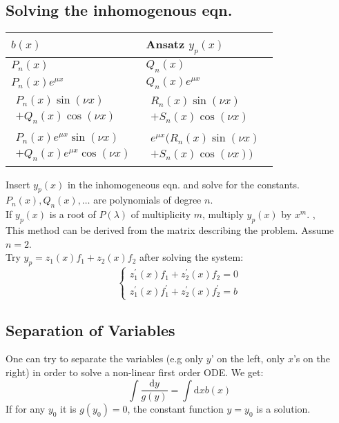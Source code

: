 \subsection{Solving the inhomogenous eqn.}
\Procedure[Ansatz]
\begin{table}[H]
  \begin{center}
    \begin{tabular}{l|l}
      $b(x)$ & Ansatz $y_p(x)$ \\
      \hline
      
      $P_n(x)$ & $Q_n(x)$ \\
      $P_n(x)e^{\mu x}$ & $Q_n(x)e^{\mu x}$\\
      \hline
      
      $\begin{matrix}
      P_n(x) \sin(\nu x) \\ + 
      Q_n(x)\cos(\nu x)
      \end{matrix}$ 
      & $\begin{matrix}R_n(x)\sin(\nu x)\qquad\\ 
      + S_n(x)\cos(\nu x)\end{matrix}$ \\
      \hline
      
      $\begin{matrix}P_n(x)e^{\mu x}\sin(\nu x) \\
       + Q_n(x)e^{\mu x}\cos(\nu x)\end{matrix} $
      & $\begin{matrix}e^{\mu x}(R_n(x)\sin(\nu x) \\ + S_n(x)\cos(\nu x))\end{matrix}$
    \end{tabular}
  \end{center}
\end{table}
Insert $y_p(x)$ in the inhomogeneous eqn. and solve for the constants. $P_n(x), Q_n(x), \dots$ are polynomials of degree $n$. \\
\Remark If $y_p(x)$ is a root of $P(\lambda)$ of multiplicity $m$, multiply $y_p(x)$ by $x^m$.
\sep
{} \\
This method can be derived from the matrix describing the problem. Assume $n=2$. \\
Try $y_p = z_{1}(x) f_{1}+z_{2}(x)f_{2}$ after solving the system:
$$
\left\{\begin{array}{l}
z_{1}^{\prime}(x) f_{1}+z_{2}^{\prime}(x) f_{2}=0 \\
z_{1}^{\prime}(x) f_{1}^{\prime}+z_{2}^{\prime}(x) f_{2}^{\prime}=b
\end{array}\right.
$$

\subsection{Separation of Variables}
\Recipe
One can try to separate the variables (e.g only $y$' on the left, only $x$'s on the right) in order to solve a non-linear first order ODE. We get:
$$\int \frac{\mathrm{d} y}{g(y)}=\int \mathrm{d} x b(x)$$
If for any $y_0$ it is $g(y_0)=0$, the constant function $y=y_0$ is a solution.